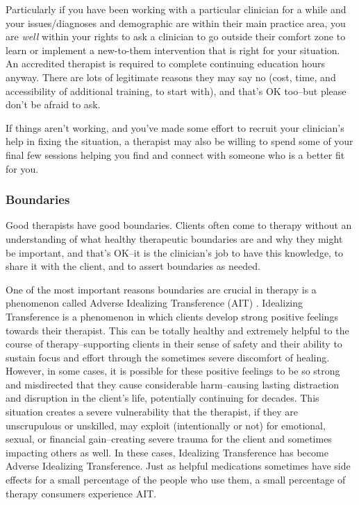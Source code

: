 \documentclass[12pt,letterpaper]{book}
\begin{document}
Particularly if you have been working with a particular clinician for a while and your issues/diagnoses and demographic are within their main practice area, you are \textit{well} within your rights to ask a clinician to go outside their comfort zone to learn or implement a new-to-them intervention that is right for your situation. An accredited therapist is required to complete continuing education hours anyway. There are lots of legitimate reasons they may say no (cost, time, and accessibility of additional training, to start with), and that's OK too–but please don't be afraid to ask.

If things aren't working, and you've made some effort to recruit your clinician's help in fixing the situation, a therapist may also be willing to spend some of your final few sessions helping you find and connect with someone who is a better fit for you.

\subsubsection*{Boundaries}
\label{def:ait}
Good therapists have good boundaries. Clients often come to therapy without an understanding of what healthy therapeutic boundaries are and why they might be important, and that's OK–it is the clinician's job to have this knowledge, to share it with the client, and to assert boundaries as needed.

One of the most important reasons boundaries are crucial in therapy is a phenomenon called Adverse Idealizing Transference (AIT) \cite{hook2018boundary,transferranceLoveHarm}. Idealizing Transference is a phenomenon in which clients develop strong positive feelings towards their therapist. This can be totally healthy and extremely helpful to the course of therapy–supporting clients in their sense of safety and their ability to sustain focus and effort through the sometimes severe discomfort of healing. However, in some cases, it is possible for these positive feelings to be so strong and misdirected that they cause considerable harm–causing lasting distraction and disruption in the client's life, potentially continuing for decades. This situation creates a severe vulnerability that the therapist, if they are unscrupulous or unskilled, may exploit (intentionally or not) for emotional, sexual, or financial gain–creating severe trauma for the client and sometimes impacting others as well. In these cases, Idealizing Transference has become Adverse Idealizing Transference. Just as helpful medications sometimes have side effects for a small percentage of the people who use them, a small percentage of therapy consumers experience AIT.
\end{document}
